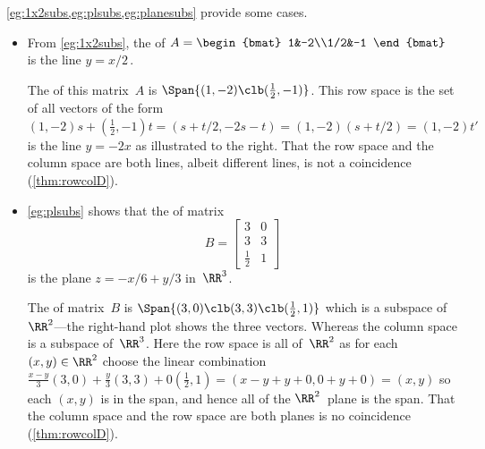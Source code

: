 \begin{example} 
\cref{eg:1x2subs,eg:plsubs,eg:planesubs} provide some cases.
\begin{itemize}
\item 
\begin{figbox}{}%
From \cref{eg:1x2subs}, the  of \(A=\begin{bmat} 1&-2\\1/2&-1 \end{bmat}\) is the line \(y=x/2\)\,.

The  of this matrix~\(A\) is \(\Span\{(1,-2)\clb (\frac12,-1)\}\).
This row space is the set of all vectors of the form \((1,-2)s+(\frac12,-1)t=(s+t/2,-2s-t)=(1,-2)(s+t/2)=(1,-2)t'\) is the line \(y=-2x\) as illustrated to the right.
That the row space and the column space are both lines, albeit different lines, is not a coincidence (\cref{thm:rowcolD}).
\end{figbox}


\item \cref{eg:plsubs} shows that the  of matrix
\begin{equation*}
B=\begin{bmatrix} 3&0\\3&3\\\frac12&1 \end{bmatrix}
\end{equation*}
is the plane \(z=-x/6+y/3\) in~\(\RR^3\).

\begin{figbox}{}%
The  of matrix~\(B\) is \(\Span\{(3,0)\clb (3,3)\clb (\frac12,1)\}\) which is a subspace of~\(\RR^2\)---the right-hand plot shows the three vectors. 
Whereas the column space is a subspace of~\(\RR^3\).
Here the row space is all of~\(\RR^2\) as for each \((x,y)\in\RR^2\) choose  the linear combination \(\frac{x-y}3(3,0)+\frac{y}3(3,3)+0(\frac12,1)=(x-y+y+0,0+y+0)=(x,y)\) so each \((x,y)\) is in the span, and hence all of the \(\RR^2\)~plane is the span.
That the column space and the row space are both planes is no coincidence (\cref{thm:rowcolD}).
\end{figbox}



\end{itemize}
\end{example}
